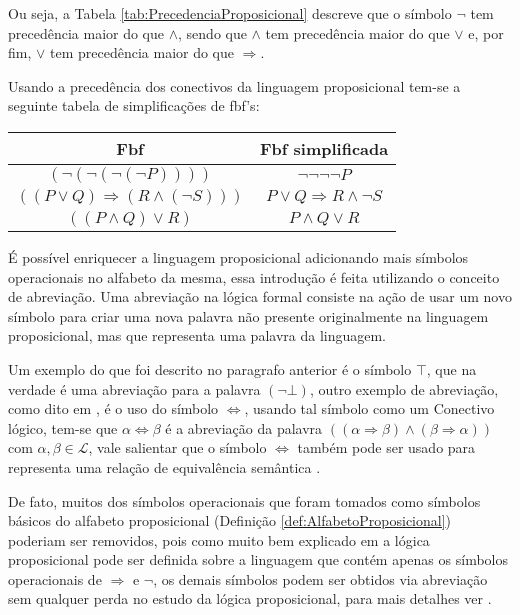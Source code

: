 Ou seja, a Tabela \ref{tab:PrecedenciaProposicional} descreve que o símbolo $\neg$ tem precedência maior do que $\land$, sendo que $\land$ tem precedência maior do que $\lor$ e, por fim, $\lor$ tem precedência maior do que $\Rightarrow$.


\begin{exemplo}\label{exe:}
  Usando a precedência dos conectivos da linguagem proposicional tem-se a seguinte tabela de simplificações de fbf's:

  \begin{table}[H]
    \centering
    \begin{tabular}{cc}
      \hline
      Fbf & Fbf simplificada\\
      \hline
      $(\neg (\neg (\neg (\neg P))))$ & $\neg \neg \neg \neg P$\\
      $((P \lor Q) \Rightarrow (R \land (\neg S)))$ & $P \lor Q \Rightarrow R \land \neg S$\\
      $((P \land Q) \lor R)$ & $P \land Q \lor R$\\
      \hline
    \end{tabular}
  \end{table}
\end{exemplo}

É possível enriquecer a linguagem proposicional adicionando mais símbolos operacionais no alfabeto da mesma, essa introdução é feita utilizando o conceito de abreviação. Uma abreviação na lógica formal consiste na ação de usar um novo símbolo para criar uma nova palavra não presente originalmente na linguagem proposicional, mas que representa uma palavra da linguagem. 

Um exemplo do que foi descrito no paragrafo anterior é o símbolo $\top$, que na verdade é uma abreviação para a palavra $(\neg \bot)$, outro exemplo de abreviação, como dito em \cite{joaoPavao2014}, é o uso do símbolo $\Leftrightarrow$, usando tal símbolo como um Conectivo lógico, tem-se que $\alpha \Leftrightarrow \beta$ é a abreviação  da palavra $((\alpha \Rightarrow \beta) \land (\beta \Rightarrow \alpha))$ com $\alpha, \beta \in \mathcal{L}$, vale salientar que o símbolo $\Leftrightarrow$ também pode ser usado para representa uma relação de equivalência semântica \cite{benja-Logica,edgar2002,nunes2008}.

De fato, muitos dos símbolos operacionais que foram tomados como símbolos básicos do alfabeto proposicional (Definição \ref{def:AlfabetoProposicional}) poderiam ser removidos, pois como muito bem explicado em \cite{benja-Logica, joaoPavao2014} a lógica proposicional pode ser definida sobre a linguagem que contém apenas os símbolos operacionais de $\Rightarrow$ e $\neg$, os demais símbolos podem ser obtidos via abreviação sem qualquer perda no estudo da lógica proposicional, para mais detalhes ver \cite{benja-Logica}.

